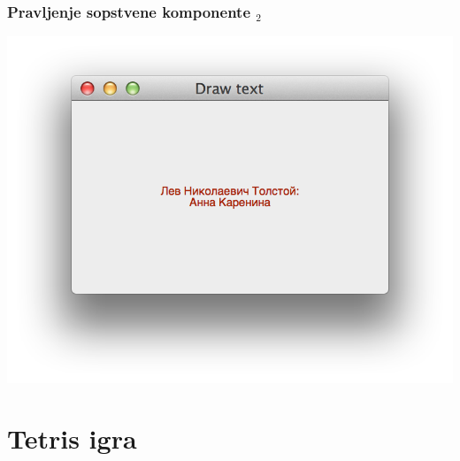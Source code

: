 \documentclass[utf8,compress]{beamer}
\begin{document}
\begin{frame}[fragile]
  \frametitle{Pravljenje sopstvene komponente $_2$}
\begin{center}
\includegraphics[scale=0.5]{pyqt17.png}
\end{center}
\end{frame}

\section[Tetris]{Tetris igra}
\end{document}

